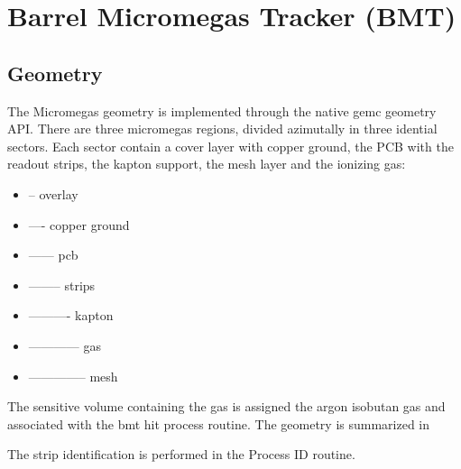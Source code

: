 \section{Barrel Micromegas Tracker (BMT)}

\subsection{Geometry}

The Micromegas geometry is implemented through the native gemc geometry API.
There are three micromegas regions, divided azimutally in three idential sectors. Each sector contain a cover layer with copper ground,
the PCB with the readout strips, the kapton support, the mesh layer and the ionizing gas:

\begin{itemize}
	\item -- overlay
	\item ---- copper ground
	\item ------ pcb
	\item -------- strips
	\item ---------- kapton
	\item ------------ gas
	\item -------------- mesh
\end{itemize}

The sensitive volume containing the gas is assigned the argon isobutan gas and associated with the bmt hit process routine.
The geometry is summarized in 

The strip identification is performed in the Process ID routine.

